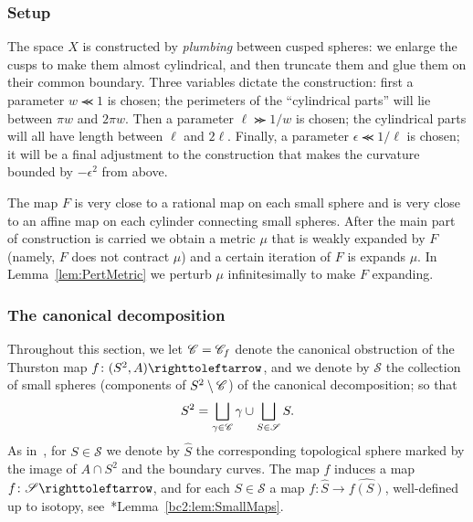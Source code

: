 \documentclass{amsart}
\newcommand\Sph{{\mathscr S}}
\begin{document}
\subsubsection{Setup}
\label{sss:Prf:setup} 
The space $X$ is constructed by \emph{plumbing} between cusped
spheres: we enlarge the cusps to make them almost cylindrical, and
then truncate them and glue them on their common boundary. Three
variables dictate the construction: first a parameter $w\llcurly 1$ is
chosen; the perimeters of the ``cylindrical parts'' will lie between
$\pi w$ and $2\pi w$. Then a parameter $\ell\ggcurly 1/w$ is chosen;
the cylindrical parts will all have length between $\ell$ and
$2\ell$. Finally, a parameter $\epsilon\llcurly 1/\ell$ is chosen; it
will be a final adjustment to the construction that makes the
curvature bounded by $-\epsilon^2$ from above.

The map $F$ is very close to a rational map on each small sphere and
is very close to an affine map on each cylinder connecting small
spheres. After the main part of construction is carried we obtain a
metric $\mu$ that is weakly expanded by $F$ (namely, $F$ does not
contract $\mu$) and a certain iteration of $F$ is expands $\mu$. In
Lemma~\ref{lem:PertMetric} we perturb $\mu$ infinitesimally to make
$F$ expanding.

\subsubsection{The canonical decomposition}
Throughout this section, we let ${\mathscr C}={\mathscr C}_f$ denote the canonical
obstruction of the Thurston map $f\colon(S^2,A)\selfmap$, and we
denote by $\Sph$ the collection of small spheres (components of
$S^2\setminus {\mathscr C}$) of the canonical decomposition; so that
\[S^2=\bigsqcup_{\gamma\in\CC}\gamma\cup\bigsqcup_{S\in\Sph}S.
\]
As in~\cite{bartholdi-dudko:bc2}, for $S\in \Sph$ we denote by
$\widehat S$ the corresponding topological sphere marked by the image
of $A\cap S^2$ and the boundary curves. The map $f$ induces a map
$f\colon\Sph\selfmap$, and for each $S\in\Sph$ a map
$f\colon \widehat S\to \widehat{f(S)}$, well-defined up to isotopy,
see~\cite{bartholdi-dudko:bc2}*{Lemma~\ref{bc2:lem:SmallMaps}}.
 
\end{document}

